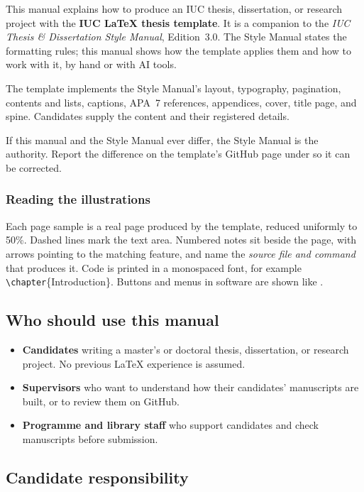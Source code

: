 \documentclass[11pt,a4paper]{article}
\newcommand\cmd[1]{\texttt{\textbackslash #1}}
\begin{document}
This manual explains how to produce an IUC thesis, dissertation, or research
project with the \textbf{IUC LaTeX thesis template}. It is a companion to the
\emph{IUC Thesis \& Dissertation Style Manual}, Edition~3.0. The Style Manual
states the formatting rules; this manual shows how the template applies them
and how to work with it, by hand or with AI tools.

The template implements the Style Manual's layout, typography, pagination,
contents and lists, captions, APA~7 references, appendices, cover, title page,
and spine. Candidates supply the content and their registered details.

If this manual and the Style Manual ever differ, the Style Manual is the
authority. Report the difference on the template's GitHub page under
 so it can be corrected.

\subsubsection*{Reading the illustrations}

Each page sample is a real page produced by the template, reduced uniformly to
50\%. Dashed lines mark the text area. Numbered notes sit beside the page, with
arrows pointing to the matching feature, and name the \emph{source file and
command} that produces it. Code is printed in a monospaced font, for example
\cmd{chapter}\{Introduction\}. Buttons and menus in software are shown like
.

\subsection{Who should use this manual}

\begin{itemize}
  \item \textbf{Candidates} writing a master's or doctoral thesis, dissertation,
        or research project. No previous LaTeX experience is assumed.
  \item \textbf{Supervisors} who want to understand how their candidates'
        manuscripts are built, or to review them on GitHub.
  \item \textbf{Programme and library staff} who support candidates and check
        manuscripts before submission.
\end{itemize}

\subsection{Candidate responsibility}
\end{document}
